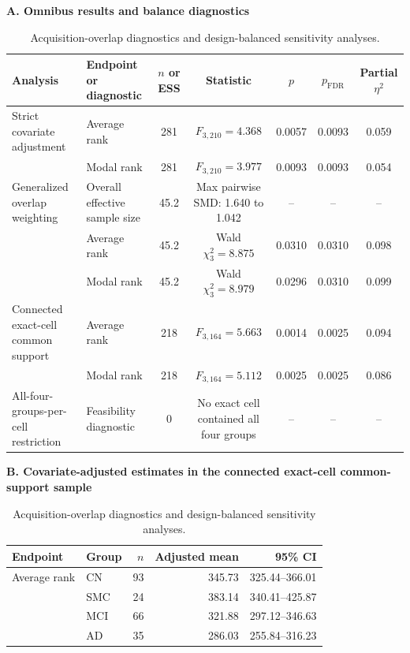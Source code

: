 \documentclass{article}
\begin{document}
\begin{table}[!htbp]
\color{blue}
\centering
\caption{Acquisition-overlap diagnostics and design-balanced sensitivity analyses.}
\label{tab:acquisition_overlap}
\footnotesize
\setlength{\tabcolsep}{3pt}
\textbf{A. Omnibus results and balance diagnostics}\par\vspace{1mm}
\begin{tabularx}{\textwidth}{@{}>{\raggedright\arraybackslash}p{}>{\raggedright\arraybackslash}Xccccc@{}}
\toprule
Analysis & Endpoint or diagnostic & $n$ or ESS & Statistic & $p$ & $p_{\mathrm{FDR}}$ & Partial $\eta^2$\\
\midrule
Strict covariate adjustment & Average rank & 281 & $F_{3,210}=4.368$ & 0.0057 & 0.0093 & 0.059\\
& Modal rank & 281 & $F_{3,210}=3.977$ & 0.0093 & 0.0093 & 0.054\\
\addlinespace
Generalized overlap weighting & Overall effective sample size & 45.2 & Max pairwise SMD: 1.640 to 1.042 & -- & -- & --\\
& Average rank & 45.2 & Wald $\chi^2_3=8.875$ & 0.0310 & 0.0310 & 0.098\\
& Modal rank & 45.2 & Wald $\chi^2_3=8.979$ & 0.0296 & 0.0310 & 0.099\\
\addlinespace
Connected exact-cell common support & Average rank & 218 & $F_{3,164}=5.663$ & 0.0014 & 0.0025 & 0.094\\
& Modal rank & 218 & $F_{3,164}=5.112$ & 0.0025 & 0.0025 & 0.086\\
\addlinespace
All-four-groups-per-cell restriction & Feasibility diagnostic & 0 & No exact cell contained all four groups & -- & -- & --\\
\bottomrule
\end{tabularx}
\par\vspace{3mm}
\textbf{B. Covariate-adjusted estimates in the connected exact-cell common-support sample}\par\vspace{1mm}
\begin{tabular}{llrrr}
\toprule
Endpoint & Group & $n$ & Adjusted mean & 95\% CI\\
\midrule
Average rank & CN & 93 & 345.73 & 325.44--366.01\\
& SMC & 24 & 383.14 & 340.41--425.87\\
& MCI & 66 & 321.88 & 297.12--346.63\\
& AD & 35 & 286.03 & 255.84--316.23\\

\end{tabular}
\end{table}
\end{document}
